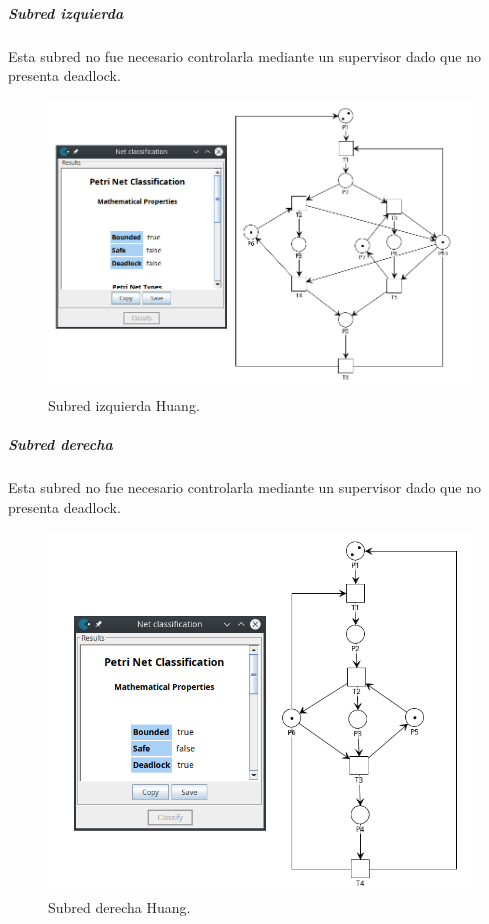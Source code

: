 \subparagraph{Subred izquierda}
\hfill \break
Esta subred no fue necesario controlarla mediante un supervisor dado que no presenta deadlock.

\begin{figure}[H]
	\centering
	\includegraphics[scale=0.5]{Figures/algoritmo3/Huang2.png}
	\caption{Subred izquierda Huang.}
	\label{fig:Huang_subredizq}
 \end{figure}
 
 \subparagraph{Subred derecha}
\hfill \break
Esta subred no fue necesario controlarla mediante un supervisor dado que no presenta deadlock.

\begin{figure}[H]
	\centering
	\includegraphics[scale=0.5]{Figures/algoritmo3/Huang3.png}
	\caption{Subred derecha Huang.}
	\label{fig:Huang_subredder}
 \end{figure}

